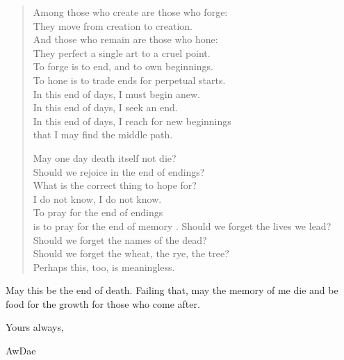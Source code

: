 \begin{quote}
Among those who create are those who forge:\\
They move from creation to creation.\\
And those who remain are those who hone:\\
They perfect a single art to a cruel point.\\
To forge is to end, and to own beginnings.\\
To hone is to trade ends for perpetual starts.\\
In this end of days, I must begin anew.\\
In this end of days, I seek an end.\\
In this end of days, I reach for new beginnings\\
that I may find the middle path.

May one day death itself not die?\\
Should we rejoice in the end of endings?\\
What is the correct thing to hope for?\\
I do not know, I do not know.\\
To pray for the end of endings\\
is to pray for the end of memory . Should we forget the lives we lead?\\
Should we forget the names of the dead?\\
Should we forget the wheat, the rye, the tree?\\
Perhaps this, too, is meaningless.
\end{quote}

May this be the end of death. Failing that, may the memory of me die and be food for the growth for those who come after.

Yours always,

AwDae
